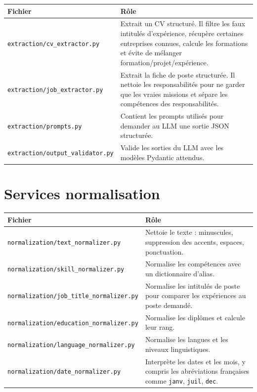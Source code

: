 \documentclass[12pt,a4paper]{report}
\begin{document}
\begin{longtable}{|p{5cm}|p{9cm}|}
\hline
\textbf{Fichier} & \textbf{Rôle} \\
\hline
\endhead
\texttt{extraction/cv\_extractor.py} & Extrait un CV structuré. Il filtre les faux intitulés d'expérience, récupère certaines entreprises connues, calcule les formations et évite de mélanger formation/projet/expérience. \\
\hline
\texttt{extraction/job\_extractor.py} & Extrait la fiche de poste structurée. Il nettoie les responsabilités pour ne garder que les vraies missions et sépare les compétences des responsabilités. \\
\hline
\texttt{extraction/prompts.py} & Contient les prompts utilisés pour demander au LLM une sortie JSON structurée. \\
\hline
\texttt{extraction/output\_validator.py} & Valide les sorties du LLM avec les modèles Pydantic attendus. \\
\hline
\end{longtable}

\section{Services normalisation}

\begin{longtable}{|p{5cm}|p{9cm}|}
\hline
\textbf{Fichier} & \textbf{Rôle} \\
\hline
\endhead
\texttt{normalization/text\_normalizer.py} & Nettoie le texte : minuscules, suppression des accents, espaces, ponctuation. \\
\hline
\texttt{normalization/skill\_normalizer.py} & Normalise les compétences avec un dictionnaire d'alias. \\
\hline
\texttt{normalization/job\_title\_normalizer.py} & Normalise les intitulés de poste pour comparer les expériences au poste demandé. \\
\hline
\texttt{normalization/education\_normalizer.py} & Normalise les diplômes et calcule leur rang. \\
\hline
\texttt{normalization/language\_normalizer.py} & Normalise les langues et les niveaux linguistiques. \\
\hline
\texttt{normalization/date\_normalizer.py} & Interprète les dates et les mois, y compris les abréviations françaises comme \texttt{janv}, \texttt{juil}, \texttt{dec}. \\
\hline
\end{longtable}
\end{document}
